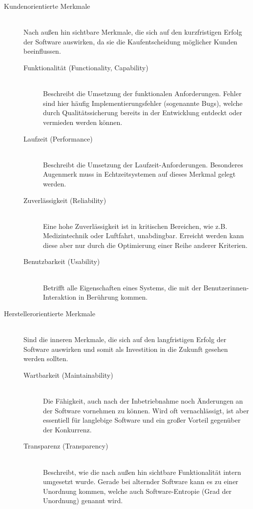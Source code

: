 \begin{description}
  \item[Kundenorientierte Merkmale] \hfill \\ Nach außen hin sichtbare Merkmale, die sich auf den kurzfristigen Erfolg der Software auswirken, da sie die Kaufentscheidung möglicher Kunden beeinflussen.
  \begin{description}
    \item[Funktionalität (Functionality, Capability)] \hfill \\ Beschreibt die Umsetzung der funktionalen Anforderungen. Fehler sind hier häufig Implementierungsfehler (sogenannte Bugs), welche durch Qualitäts\-sich\-erung bereits in der Entwicklung entdeckt oder vermieden werden können. 
    \item[Laufzeit (Performance)] \hfill \\ Beschreibt die Umsetzung der Laufzeit-Anforderungen. Besonderes Augenmerk muss in Echtzeitsystemen auf dieses Merkmal gelegt werden.
    \item[Zuverlässigkeit (Reliability)] \hfill \\ Eine hohe Zuverlässigkeit ist in kritischen Bereichen, wie z.B. Medizintechnik oder Luftfahrt, unabdingbar. Erreicht werden kann diese aber nur durch die Optimierung einer Reihe anderer Kriterien.
    \item[Benutzbarkeit (Usability)] \hfill \\ Betrifft alle Eigenschaften eines Systems, die mit der Benutzerinnen-Interaktion in Berührung kommen.
  \end{description}
  \item[Herstellerorientierte Merkmale] \hfill \\ Sind die inneren Merkmale, die sich auf den langfristigen Erfolg der Software auswirken und somit als Investition in die Zukunft gesehen werden sollten.
  \begin{description}
    \item[Wartbarkeit (Maintainability)] \hfill \\ Die Fähigkeit, auch nach der Inbetriebnahme noch Änderungen an der Software vornehmen zu können. Wird oft vernachlässigt, ist aber essentiell für langlebige Software und ein großer Vorteil gegenüber der Konkurrenz.
    \item[Transparenz (Transparency)] \hfill \\ Beschreibt, wie die nach außen hin sichtbare Funktionalität intern umgesetzt wurde. Gerade bei alternder Software kann es zu einer Unordnung kommen, welche auch Software-Entropie (Grad der Unordnung) genannt wird.

\end{description}
\end{description}
